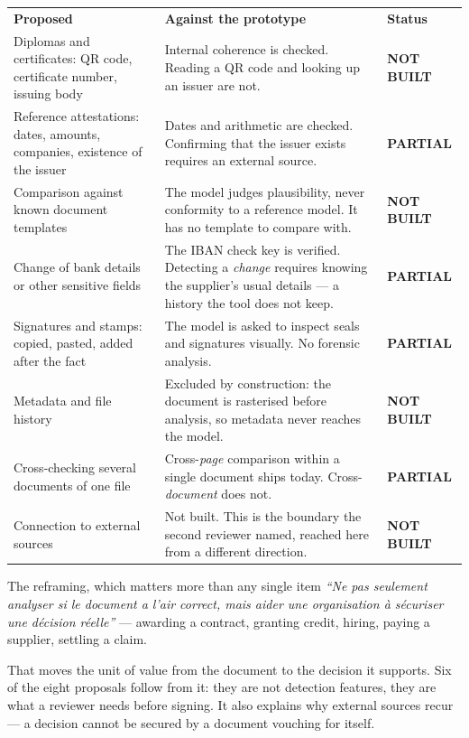 \documentclass[10pt,a4paper]{article}
\newcommand{\partly}{{\footnotesize\color{muted}\bfseries PARTIAL}}
\newcommand{\notbuilt}{{\footnotesize\color{bad}\bfseries NOT BUILT}}
\begin{document}
\vspace{3pt}
\begin{tabular}{@{}>{\raggedright\arraybackslash}p{52mm}
                  >{\raggedright\arraybackslash}p{\dimexpr\linewidth-87mm}
                  >{\raggedright\arraybackslash}p{25mm}@{}}
\rowcolor{zebra}\textbf{\color{navy}Proposed} & \textbf{\color{navy}Against the prototype} &
\textbf{\color{navy}Status} \\[3pt]
Diplomas and certificates: QR code, certificate number, issuing body &
Internal coherence is checked. Reading a QR code and looking up an issuer are
not. & \notbuilt \\[3pt]
\rowcolor{zebra}Reference attestations: dates, amounts, companies, existence of
the issuer &
Dates and arithmetic are checked. Confirming that the issuer exists requires an
external source. & \partly \\[3pt]
Comparison against known document templates &
The model judges plausibility, never conformity to a reference model. It has no
template to compare with. & \notbuilt \\[3pt]
\rowcolor{zebra}Change of bank details or other sensitive fields &
The IBAN check key is verified. Detecting a \emph{change} requires knowing the
supplier's usual details --- a history the tool does not keep. & \partly \\[3pt]
Signatures and stamps: copied, pasted, added after the fact &
The model is asked to inspect seals and signatures visually. No forensic
analysis. & \partly \\[3pt]
\rowcolor{zebra}Metadata and file history &
Excluded by construction: the document is rasterised before analysis, so
metadata never reaches the model. & \notbuilt \\[3pt]
Cross-checking several documents of one file &
Cross-\emph{page} comparison within a single document ships today. Cross-%
\emph{document} does not. & \partly \\[3pt]
\rowcolor{zebra}Connection to external sources &
Not built. This is the boundary the second reviewer named, reached here from a
different direction. & \notbuilt \\
\end{tabular}

\vspace{5pt}
\begin{note}{The reframing, which matters more than any single item}
\emph{``Ne pas seulement analyser si le document a l'air correct, mais aider une
organisation à sécuriser une décision réelle''} --- awarding a contract, granting
credit, hiring, paying a supplier, settling a claim.

\vspace{3pt}
That moves the unit of value from the document to the decision it supports. Six
of the eight proposals follow from it: they are not detection features, they are
what a reviewer needs before signing. It also explains why external sources
recur --- a decision cannot be secured by a document vouching for itself.
\end{note}
\end{document}
